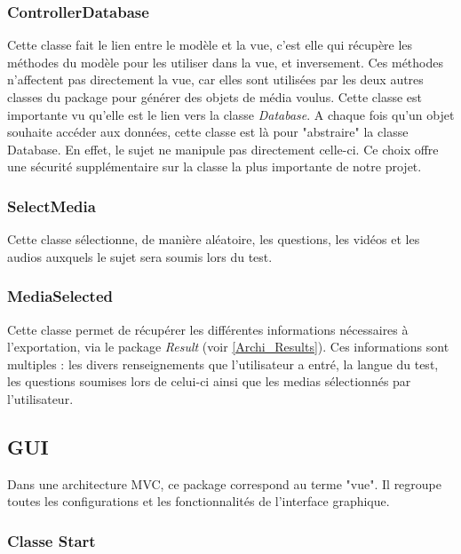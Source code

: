 \subsubsection{ControllerDatabase}

Cette classe fait le lien entre le modèle et la vue, c'est elle qui récupère les méthodes du modèle pour les utiliser dans la vue, et inversement. Ces méthodes n'affectent pas directement la vue, car elles sont utilisées par les deux autres classes du package pour générer des objets de média voulus.
Cette classe est importante vu qu'elle est le lien vers la classe \textit{Database}. A chaque fois qu'un objet souhaite accéder aux données, cette classe est là pour "abstraire" la classe Database. En effet, le sujet ne manipule pas directement celle-ci. Ce choix offre une sécurité supplémentaire sur la classe la plus importante de notre projet.

\subsubsection{SelectMedia}

Cette classe sélectionne, de manière aléatoire, les questions, les vidéos et les audios auxquels le sujet sera soumis lors du test.

\subsubsection{MediaSelected}

Cette classe permet de récupérer les différentes informations nécessaires à l'exportation, via le package \textit{Result} (voir \ref{Archi_Results}). Ces informations sont multiples : les divers renseignements que l'utilisateur a entré, la langue du test, les questions soumises lors de celui-ci ainsi que les medias sélectionnés par l'utilisateur.


\subsection{GUI}\label{modele}

Dans une architecture MVC, ce package correspond au terme "vue". Il regroupe toutes les configurations et les fonctionnalités de l'interface graphique.

\subsubsection{Classe Start}

